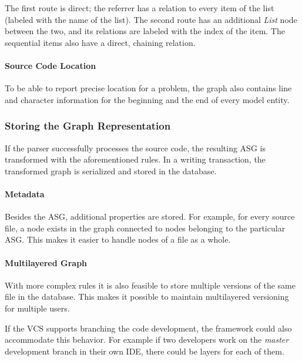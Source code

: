 The first route is direct; the referrer has a relation to every item of the list (labeled with the name of the list). The second route has an additional \emph{List} node between the two, and its relations are labeled with the index of the item. The sequential items also have a direct, chaining relation.


\paragraph{Source Code Location}
To be able to report precise location for a problem, the graph also contains line and character information for the beginning and the end of every model entity.


\subsubsection{Storing the Graph Representation}
If the parser successfully processes the source code, the resulting ASG is transformed with the aforementioned rules. In a writing transaction, the transformed graph is serialized and stored in the database.

\paragraph{Metadata}
Besides the ASG, additional properties are stored. For example, for every source file, a node exists in the graph connected to nodes belonging to the particular ASG. This makes it easier to handle nodes of a file as a whole.

\paragraph{Multilayered Graph}
With more complex rules it is also feasible to store multiple versions of the same file in the database. This makes it possible to maintain multilayered versioning for multiple users.

If the VCS supports branching the code development, the framework could also accommodate this behavior. For example if two developers work on the \emph{master} development branch in their own IDE, there could be layers for each of them.

